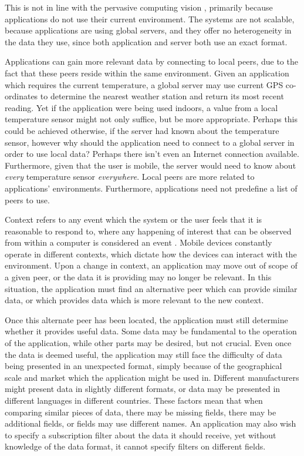 \documentclass[12pt,twoside,notitlepage]{report}
\begin{document}
This is not in line with the pervasive computing vision \cite{weiser1991computer}, primarily because applications do not use their current environment. 
The systems are not scalable, because applications are using global servers, and they offer no heterogeneity\cite{saha2003pervasive} in the data they use, since both application and server both use an exact format.

Applications can gain more relevant data by connecting to local peers, due to the fact that these peers reside within the same environment.
Given an application which requires the current temperature, a global server may use current GPS co-ordinates to determine the nearest weather station and return its most recent reading. 
Yet if the application were being used indoors, a value from a local temperature sensor might not only suffice, but be more appropriate. 
Perhaps this could be achieved otherwise, if the server had known about the temperature sensor, however why should the application need to connect to a global server in order to use local data? Perhaps there isn't even an Internet connection available. 
Furthermore, given that the user is mobile, the server would need to know about {\sl every} temperature sensor {\sl everywhere}. 
Local peers are more related to applications' environments. 
Furthermore, applications need not predefine a list of peers to use.

Context refers to any event which the system or the user feels that it is reasonable to respond to, where any happening of interest that can be observed from within a computer is considered an event \cite[p11]{muhl2006distributed}. 
Mobile devices constantly operate in different contexts, which dictate how the devices can interact with the environment. 
Upon a change in context, an application may move out of scope of a given peer, or the data it is providing may no longer be relevant. 
In this situation, the application must find an alternative peer which can provide similar data, or which provides data which is more relevant to the new context. 

Once this alternate peer has been located, the application must still determine whether it provides useful data. 
Some data may be fundamental to the operation of the application, while other parts may be desired, but not crucial.  
Even once the data is deemed useful, the application may still face the difficulty of data being presented in an unexpected format, simply because of the geographical scale and market which the application might be used in. 
Different manufacturers might present data in slightly different formats, or data may be presented in different languages in different countries. 
These factors mean that when comparing similar pieces of data, there may be missing fields, there may be additional fields, or fields may use different names. 
An application may also wish to specify a subscription filter about the data it should receive, yet without knowledge of the data format, it cannot specify filters on different fields.
\end{document}
